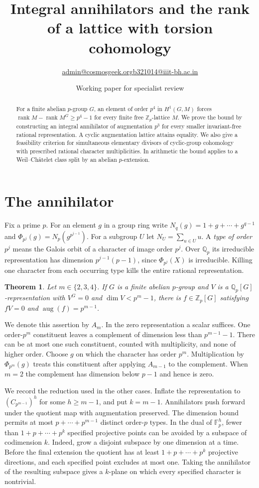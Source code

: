\documentclass[11pt]{article}
\title{Integral annihilators and the rank of a lattice with torsion cohomology}
\author{\small \href{mailto:admin@cosmosgeek.org}{admin@cosmosgeek.org}\qquad \href{mailto:b321014@iiit-bh.ac.in}{b321014@iiit-bh.ac.in}}
\date{Working paper for specialist review}
\newtheorem{theorem}{Theorem}
\newcommand{\Z}{\mathbb Z}
\newcommand{\Q}{\mathbb Q}
\newcommand{\F}{\mathbb F}
\newcommand{\aug}{\operatorname{aug}}
\newcommand{\rk}{\operatorname{rank}}
\newcommand{\Ph}[1]{\Phi_{p^{#1}}}
\begin{document}
\maketitle
\begin{abstract}
For a finite abelian $p$-group $G$, an element of order $p^4$ in $H^1(G,M)$
forces $\rk M-\rk M^G\ge p^4-1$ for every finite free $\Z_p$-lattice
$M$. We prove the bound by constructing an integral annihilator of
augmentation $p^3$ for every smaller invariant-free rational representation.
A cyclic augmentation lattice attains equality. We also give a feasibility
criterion for simultaneous elementary divisors of cyclic-group cohomology
with prescribed rational character multiplicities. In arithmetic the bound
applies to a Weil--Ch\^atelet class split by an abelian $p$-extension.
\end{abstract}

\section{The annihilator}
Fix a prime $p$. For an element $g$ in a group ring write
$N_q(g)=1+g+\cdots+g^{q-1}$ and
$\Ph{j}(g)=N_p(g^{p^{j-1}})$. For a subgroup $U$ let
$N_U=\sum_{u\in U}u$. A \emph{type of order $p^j$} means the Galois
orbit of a character of image order $p^j$. Over $\Q_p$ its irreducible
representation has dimension $p^{j-1}(p-1)$, since $\Ph{j}(X)$ is
irreducible. Killing one character from each occurring type kills the
entire rational representation.

\begin{theorem}\label{thm:main}
Let $m\in\{2,3,4\}$. If $G$ is a finite abelian $p$-group and
$V$ is a $\Q_p[G]$-representation with $V^G=0$ and
$\dim V<p^m-1$, there is $f\in\Z_p[G]$ satisfying
$fV=0$ and $\aug(f)=p^{m-1}$.
\end{theorem}

We denote this assertion by $A_m$. In the zero representation a scalar
suffices. One order-$p^m$ constituent leaves a complement of dimension
less than $p^{m-1}-1$. There can be at most one such constituent, counted
with multiplicity, and none of higher order. Choose $g$ on which the
character has order $p^m$. Multiplication by $\Ph{m}(g)$ treats this
constituent after applying $A_{m-1}$ to the complement. When $m=2$ the
complement has dimension below $p-1$ and hence is zero.

We record the reduction used in the other cases. Inflate the representation
to $(C_{p^{m-1}})^h$ for some $h\ge m-1$, and put $k=m-1$.
Annihilators push forward under the quotient map with augmentation preserved.
The dimension bound permits at most $p+\cdots+p^{m-1}$ distinct
order-$p$ types. In the dual of $\F_p^h$, fewer than
$1+p+\cdots+p^k$ specified projective points can be avoided by a
subspace of codimension $k$. Indeed, grow a disjoint subspace by one
dimension at a time. Before the final extension the quotient has at
least $1+p+\cdots+p^k$ projective directions, and each specified point
excludes at most one. Taking the annihilator of the resulting subspace
gives a $k$-plane on which every specified character is nontrivial.
\end{document}
